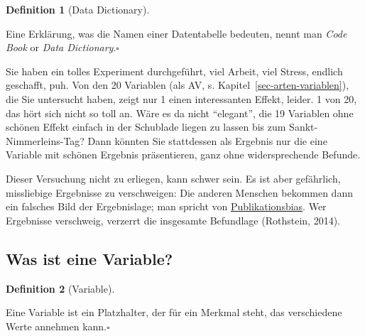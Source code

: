 \documentclass[
  a4paper,
  DIV=11]{scrreprt}
\theoremstyle{definition}
\theoremstyle{definition}
\theoremstyle{definition}
\newtheorem{definition}{Definition}[chapter]
\theoremstyle{remark}
\begin{document}
\begin{definition}[Data
Dictionary]\protect\hypertarget{def-datadict}{}\label{def-datadict}

Eine Erklärung, was die Namen einer Datentabelle bedeuten, nennt man
\emph{Code Book} or \emph{Data Dictionary}.\(\square\)

\end{definition}

\begin{tcolorbox}[enhanced jigsaw, toptitle=1mm, rightrule=.15mm, colbacktitle=quarto-callout-note-color!10!white, breakable, title=\textcolor{quarto-callout-note-color}{\faInfo}\hspace{0.5em}{Wie man mit Statistik lügt: Das File-Drawer-Problem}, bottomrule=.15mm, colback=white, opacitybacktitle=0.6, left=2mm, titlerule=0mm, toprule=.15mm, coltitle=black, opacityback=0, bottomtitle=1mm, arc=.35mm, leftrule=.75mm, colframe=quarto-callout-note-color-frame]

Sie haben ein tolles Experiment durchgeführt, viel Arbeit, viel Stress,
endlich geschafft, puh. Von den 20 Variablen (als AV, s.
Kapitel~\ref{sec-arten-variablen}), die Sie untersucht haben, zeigt nur
1 einen interessanten Effekt, leider. 1 von 20, das hört sich nicht so
toll an. Wäre es da nicht ``elegant'', die 19 Variablen ohne schönen
Effekt einfach in der Schublade liegen zu lassen bis zum
Sankt-Nimmerleins-Tag? Dann könnten Sie stattdessen als Ergebnis nur die
eine Variable mit schönen Ergebnis präsentieren, ganz ohne
widersprechende Befunde.

Dieser Versuchung nicht zu erliegen, kann schwer sein. Es ist aber
gefährlich, missliebige Ergebnisse zu verschweigen: Die anderen Menschen
bekommen dann ein falsches Bild der Ergebnislage; man spricht von
\href{https://de.wikipedia.org/wiki/Publikationsbias}{Publikationsbias}.
Wer Ergebnisse verschweig, verzerrt die insgesamte Befundlage
(Rothstein, 2014).

\end{tcolorbox}

\subsection{Was ist eine Variable?}\label{was-ist-eine-variable}

\begin{definition}[Variable]\protect\hypertarget{def-var}{}\label{def-var}

Eine Variable ist ein Platzhalter, der für ein Merkmal steht, das
verschiedene Werte annehmen kann.\(\square\)

\end{definition}
\end{document}
